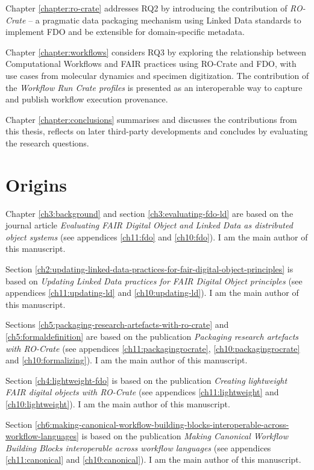 Chapter \vref{chapter:ro-crate} addresses RQ2 by introducing the contribution of \emph{RO-Crate} -- a pragmatic data packaging mechanism using Linked Data standards to implement FDO and be extensible for domain-specific metadata.  

Chapter \vref{chapter:workflows} considers RQ3 by exploring the relationship between Computational Workflows and FAIR practices using RO-Crate and FDO, with use cases from molecular dynamics and specimen digitization. The contribution of the \emph{Workflow Run Crate profiles} is presented as an interoperable way to capture and publish workflow execution provenance. 

Chapter \vref{chapter:conclusions} summarises and discusses the contributions from this thesis, reflects on later third-party developments and concludes by evaluating the research questions.


\section{Origins}
\label{intro:origins}

Chapter \ref{ch3:background} and section \ref{ch3:evaluating-fdo-ld} are based on the journal article \emph{Evaluating FAIR Digital Object and Linked Data as distributed object systems} \cite{Soiland-Reyes 2023c}  (see appendices \ref{ch11:fdo} and \ref{ch10:fdo}). I am the main author of this manuscript.

Section \ref{ch2:updating-linked-data-practices-for-fair-digital-object-principles} is based on \emph{Updating Linked Data practices for FAIR Digital Object principles} \cite{Soiland-Reyes 2022d} (see appendices \ref{ch11:updating-ld} and \ref{ch10:updating-ld}). I am the main author of this manuscript.

Sections \ref{ch5:packaging-research-artefacts-with-ro-crate} and \ref{ch5:formaldefinition} are based on the publication \emph{Packaging research artefacts with RO-Crate} \cite{Soiland-Reyes 2022a} (see appendices \ref{ch11:packagingrocrate}, \ref{ch10:packagingrocrate} and \ref{ch10:formalizing}). I am the main author of this manuscript.

Section \ref{ch4:lightweight-fdo} is based on the publication \emph{Creating lightweight FAIR digital objects with RO-Crate} \cite{Soiland-Reyes 2022c} (see appendices \ref{ch11:lightweight} and \ref{ch10:lightweight}). I am the main author of this manuscript.

Section \ref{ch6:making-canonical-workflow-building-blocks-interoperable-across-workflow-languages} is based on the publication \emph{Making Canonical Workflow Building Blocks interoperable across workflow languages} \cite{Soiland-Reyes 2022b} (see appendices \ref{ch11:canonical} and \ref{ch10:canonical}). I am the main author of this manuscript.

